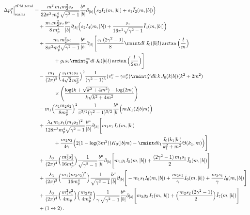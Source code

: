\begin{align}
\Delta p_1^{\mu}\Big|^{\textrm{2PM},\textrm{total}}_{\textrm{scalar}}
&=\frac{m^2\, m_1m_2^2 s_2}{32\pi^2\,m_p^4\,\sqrt{\gamma^2-1}}\frac{b^\mu}{|b|}\partial_{|b|}\Big(s_2 I_2(m,|b|)+s_1 \bar{I}_2(m,|b|)\Big)\notag\\
&\quad+\frac{m_1 m_2^2 s_2}{8\,m_p^4}\frac{b^{\mu}}{|b|}\partial_{|b|}\Big(s_2 I_{4}(m,|b|)+\frac{s_1}{16 \pi^2 \sqrt{\gamma^2-1}}\bar{I}_4(m,|b|)\Big)\notag\\
&\quad+\frac{m_1 m_2^2 s_2}{8\pi^2m_p^4\sqrt{\gamma^2-1}}\frac{b^\mu}{|b|}\partial_{|b|}\Bigg[\frac{s_1\,(2\gamma^2-1)}{8}\rmint dl\,J_{0}(|b|l)\arctan\Big(\frac{l}{m}\Big)\notag\\
&\qquad\qquad+g_1 s_2\rmint_0^\infty dl\,J_{0}(|b|l)\arctan\Big(\frac{l}{2m}\Big)\Bigg]\notag\\
&\quad-\frac{m_1}{(2\pi)^2}\Big(\frac{s_1m_2 s_2}{4\sqrt{2}\,m_p^2}\Big)^2\frac{1}{(\gamma^2-1)^3}(v_1^\mu-\gamma v_2^\mu)\rmint_{0}^{\infty}{d}k\,k\,J_{0}(k|b|)(k^2+2m^2)\notag\\
&\qquad\qquad\times\Bigg(\frac{\log(k+\sqrt{k^2+4m^2})-\log(2m)}{k\sqrt{k^2+4m^2}}\Bigg)\notag\\
&\quad-m_1\Big(\frac{s_1m_2 s_2}{8m_p^2}\Big)^2\frac{1}{\pi^{3/2}(\gamma^2-1)^{3/2}} \frac{b^\mu}{|b|}\Big(m K_1(2 |b| m)\Big)\notag\\
&\quad+\frac{\lambda_4\,m_1s_1 (m_2s_2)^2}{128\pi^3m_p^4\sqrt{\gamma^2-1}}\frac{b^\mu}{|b|}\partial_{|b|}\Bigg[m_1s_1\,I_3(m,|b|)\notag\\
&\qquad\qquad+\frac{m_2 s_2}{4\gamma}\Big(2(1-\log(3m^2))K_{0}(|b|m)-\rmint dk_1\frac{J_{0}(k_1 |b|)}{k_1^2+m^2}\Theta(k_1,m)\Big)\Bigg]\notag\\
&\quad+\frac{\lambda_3}{(2\pi)^4}\Big(\frac{m_2^3s_2^3}{16m_p^4}\Big)\frac{1}{\sqrt{\gamma^2-1}}\frac{b^\mu}{|b|}\partial_{|b|}\Bigg[m_1 g_1 I_{5}(m,|b|)+\frac{(2\gamma^2-1)\,m_1 s_1}{2}\bar{I}_{5}(m,|b|)\Bigg]\notag\\
&\quad+\frac{\lambda_3}{(2\pi)^3}\Big(\frac{m_1 (m_2 s_2)^2}{16m_p^4}\Big)\frac{1}{\sqrt{\gamma^2-1}}\frac{b^\mu}{|b|}\partial_{|b|}\Bigg[-m_1s_1 I_{6}(m,|b|)+\frac{m_2 s_2}{\gamma}\bar{I}_{6}(m,|b|)+\frac{m_2 s_1}{\gamma}\bar{I}_{6}(m,|b|)\Bigg]\notag\\
&\quad+\frac{\lambda_3}{(2\pi)^4}\Big(\frac{m_1^2 s_1^2}{4m_p}\Big)\Big(\frac{m_2 s_2}{4m_p^3}\Big)\frac{1}{\gamma\,\sqrt{\gamma^2-1}}\frac{b^\mu}{|b|}\partial_{|b|}\Bigg[m_2g_2\,I_{7}(m,|b|)+\Big(\frac{m_2 s_2\,(2\gamma^2-1)}{2}\Big)\bar{I}_{7}(m,|b|)\Bigg]\notag\\
&\quad+(1\leftrightarrow 2)\,.
\end{align}
